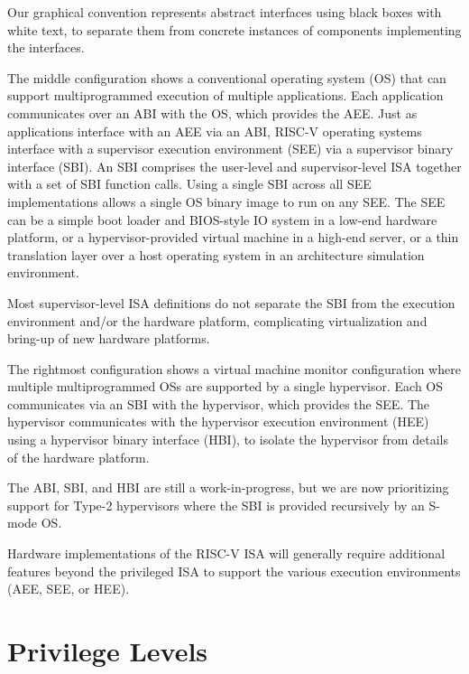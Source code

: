 \begin{commentary}
Our graphical convention represents abstract interfaces using black
boxes with white text, to separate them from concrete instances of
components implementing the interfaces.
\end{commentary}

The middle configuration shows a conventional operating system (OS)
that can support multiprogrammed execution of multiple
applications. Each application communicates over an ABI with the OS,
which provides the AEE.  Just as applications interface with an AEE
via an ABI, RISC-V operating systems interface with a supervisor
execution environment (SEE) via a supervisor binary interface (SBI).
An SBI comprises the user-level and supervisor-level ISA together with
a set of SBI function calls.  Using a single SBI across all SEE
implementations allows a single OS binary image to run on any SEE.
The SEE can be a simple boot loader and BIOS-style IO system in a
low-end hardware platform, or a hypervisor-provided virtual machine in
a high-end server, or a thin translation layer over a host operating
system in an architecture simulation environment.

\begin{commentary}
Most supervisor-level ISA definitions do not separate the SBI from the
execution environment and/or the hardware platform, complicating
virtualization and bring-up of new hardware platforms.
\end{commentary}

The rightmost configuration shows a virtual machine monitor
configuration where multiple multiprogrammed OSs are supported by a
single hypervisor.  Each OS communicates via an SBI with the
hypervisor, which provides the SEE.  The hypervisor communicates with
the hypervisor execution environment (HEE) using a hypervisor binary
interface (HBI), to isolate the hypervisor from details of the
hardware platform.

\begin{commentary}
The ABI, SBI, and HBI are still a work-in-progress, but we are now
prioritizing support for Type-2 hypervisors where the SBI is provided
recursively by an S-mode OS.
\end{commentary}

Hardware implementations of the RISC-V ISA will generally require
additional features beyond the privileged ISA to support the various
execution environments (AEE, SEE, or HEE).

\section{Privilege Levels}

